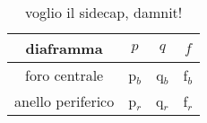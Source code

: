 \begin{table}[H]
    \centering
    \small
    \begin{tabular}{c | c c c}
		diaframma & $p$ & $q$ & $f$ \\
        \midrule
		foro centrale & p$_b$ & q$_b$ & f$_b$ \\
		anello periferico & p$_r$ & q$_r$ & f$_r$ \\
        \bottomrule
    \end{tabular}
    \caption{voglio il sidecap, damnit!}
    \label{tab:ab_sf}
\end{table}
